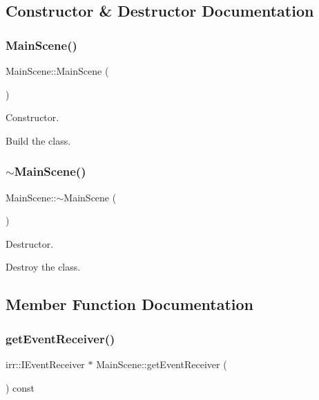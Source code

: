 \subsection{Constructor \& Destructor Documentation}
\mbox{\label{classMainScene_ad0d02863b2e1eaf96d4d2f9277398afc}} 
\subsubsection{\texorpdfstring{Main\+Scene()}{MainScene()}}
{\footnotesize\ttfamily Main\+Scene\+::\+Main\+Scene (\begin{DoxyParamCaption}{ }\end{DoxyParamCaption})}



Constructor. 

Build the class. \mbox{\label{classMainScene_a6f5a9b6606eb0534d828a11881e0a73f}} 
\subsubsection{\texorpdfstring{$\sim$\+Main\+Scene()}{~MainScene()}}
{\footnotesize\ttfamily Main\+Scene\+::$\sim$\+Main\+Scene (\begin{DoxyParamCaption}{ }\end{DoxyParamCaption})}



Destructor. 

Destroy the class. 

\subsection{Member Function Documentation}
\mbox{\label{classMainScene_af9fbc6337aa6ff42447c702e91e77237}} 
\subsubsection{\texorpdfstring{get\+Event\+Receiver()}{getEventReceiver()}}
{\footnotesize\ttfamily irr\+::\+I\+Event\+Receiver $\ast$ Main\+Scene\+::get\+Event\+Receiver (\begin{DoxyParamCaption}{ }\end{DoxyParamCaption}) const\hspace{0.3cm}{\ttfamily [virtual]}}



